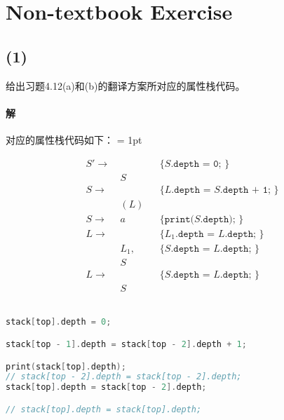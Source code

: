 \documentclass{article}
\begin{document}
\section{Non-textbook Exercise}
\subsection*{(1)}
给出习题4.12(a)和(b)的翻译方案所对应的属性栈代码。

\paragraph{解}
对应的属性栈代码如下：
\columnseprule = 1pt
\begin{multicols}{2}
    \begin{align*}
        S' \rightarrow\ & &&\texttt{\{ }S\texttt{.depth = 0; \}}\\
                         &S&& \\
        S \rightarrow\ & &&\texttt{\{ }L\texttt{.depth = }S\texttt{.depth + 1; \}}\\
                        &(L)&& \\
        S \rightarrow\  &a&& \texttt{\{ print(}S\texttt{.depth); \}}\\
        L \rightarrow\ & &&\texttt{\{ }L_1\texttt{.depth = }L\texttt{.depth; \}}\\
                        &L_1,&& \texttt{\{ }S\texttt{.depth = }L\texttt{.depth; \}}\\
                        &S&& \\
        L \rightarrow\ & &&\texttt{\{ }S\texttt{.depth = }L\texttt{.depth; \}}\\
                        &S&&
    \end{align*}
    \\
    \begin{lstlisting}[language = C,
        keywordstyle=\bfseries\color{blue!70},
        commentstyle=\color{white!80!black},
        frame=shadowbox,
        framerule = 3pt,
        rulesepcolor = \color{white},
        xleftmargin = 2mm,
        rulecolor = \color{white},
        basicstyle=\ttfamily\small,
        lineskip = 11.5pt,
        escapeinside=``]
stack[top].depth = 0;

stack[top - 1].depth = stack[top - 2].depth + 1;

print(stack[top].depth);
// stack[top - 2].depth = stack[top - 2].depth;
stack[top].depth = stack[top - 2].depth;

// stack[top].depth = stack[top].depth;

    \end{lstlisting}
\end{multicols}
\end{document}
